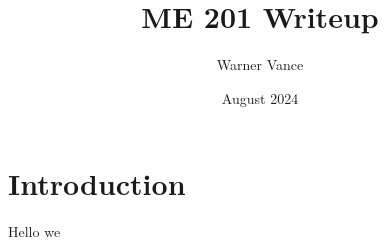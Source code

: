 \documentclass{article}
\title{ME 201 Writeup}
\author{Warner Vance}
\date{August 2024}
\begin{document}
\maketitle

\section{Introduction}
Hello we
\end{document}
